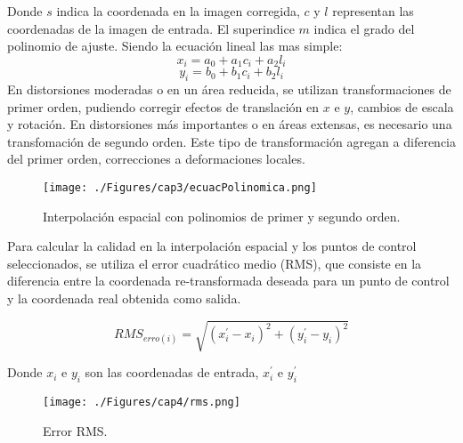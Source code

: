 Donde $ s $ indica la coordenada en la imagen corregida, $ c $ y $ l $ representan las coordenadas de la imagen de entrada. El superindice $ m $ indica el grado del polinomio de ajuste. Siendo la ecuaci\'on lineal las mas simple:
	\begin{equation}
	x_{i} = a_{0}+a_{1}c_{i}+a_{2}l_{i}
	\end{equation} 
		\begin{equation}
		y_{i} = b_{0}+b_{1}c_{i}+b_{2}l_{i}
		\end{equation} 
En distorsiones moderadas o en un \'area reducida, se utilizan transformaciones de primer orden, pudiendo corregir efectos de translaci\'on en $ x $ e $ y $, cambios de escala y rotaci\'on.
En distorsiones m\'as importantes o en \'areas extensas, es necesario una transfomaci\'on de segundo orden. Este tipo de transformaci\'on agregan a diferencia del primer orden, correcciones a deformaciones locales.
    \begin{figure}[H]
    	\centering
    	\texttt{[image: ./Figures/cap3/ecuacPolinomica.png]}
    	\caption{Interpolaci\'on espacial con polinomios de primer y segundo orden.}
    	\label{fig:intPolEcua}
    \end{figure}
 Para calcular la calidad en la interpolaci\'on espacial y los puntos de control seleccionados, se utiliza el error cuadrático medio (RMS), que consiste en la diferencia entre la coordenada re-transformada deseada para un punto de control y la coordenada real obtenida como salida.

 \begin{equation}
 RMS_{erro(i)} = \sqrt{(x_{i}^{'}-x_{i})^{2}+(y_{i}^{'}-y_{i})^{2}}
 \end{equation} 
 
 Donde $ x_{i} $ e $ y_{i} $ son las coordenadas de entrada, $ x_{i}^{'} $ e $ y_{i}^{'} $ 
 
     \begin{figure}[H]
     	\centering
     	\texttt{[image: ./Figures/cap4/rms.png]}
     	\caption{Error RMS.}
     	\label{fig:rms}
     \end{figure}




